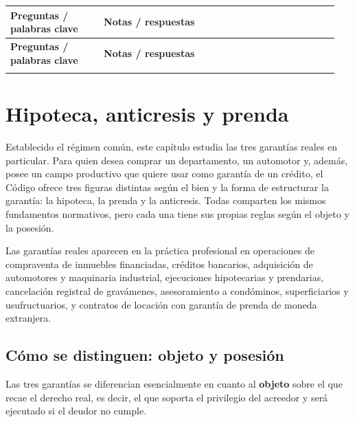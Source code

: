 \documentclass[12pt,oneside]{book}
\makeatletter
\newenvironment{cornell}{%
    \par\vspace{0.5em}
    \noindent
    \begin{longtable}{@{}>{\raggedright\arraybackslash}p{0.27\linewidth}
                         >{\raggedright\arraybackslash}p{0.68\linewidth}@{}}
    \toprule
    \textbf{Preguntas / palabras clave} & \textbf{Notas / respuestas} \\
    \midrule
    \endfirsthead
    \toprule
    \textbf{Preguntas / palabras clave} & \textbf{Notas / respuestas} \\
    \midrule
    \endhead
}{%
    \bottomrule
    \end{longtable}
}
\newcommand{\cornellsummary}[1]{%
    \midrule
    \multicolumn{2}{@{}p{\dimexpr0.95\linewidth+2\tabcolsep\relax}@{}}{%
        \vspace{0.2em}\textbf{Resumen:} #1\vspace{0.2em}} \\
}
\makeatother
\begin{document}
\begin{cornell}
\cornellsummary{El constituyente conserva las facultades inherentes a su derecho pero no puede disminuir el valor de la garantía; los actos en perjuicio de ella son inoponibles al acreedor y el pacto comisorio es nulo, sin afectar la validez del resto de la garantía. El propietario no deudor responde solo con la cosa y puede pagar y subrogarse, defenderse y reclamar el remanente. La garantía alcanza los accesorios y se traslada por subrogación real. La extinción de la garantía debe distinguirse de su cancelación registral.}
\end{cornell}

\chapter{Hipoteca, anticresis y prenda}\label{cap:hip-prenda-antic}

Establecido el régimen común, este capítulo estudia las tres garantías reales en particular. Para quien desea comprar un departamento, un automotor y, además, posee un campo productivo que quiere usar como garantía de un crédito, el Código ofrece tres figuras distintas según el bien y la forma de estructurar la garantía: la hipoteca, la prenda y la anticresis. Todas comparten los mismos fundamentos normativos, pero cada una tiene sus propias reglas según el objeto y la posesión.

Las garantías reales aparecen en la práctica profesional en operaciones de compraventa de inmuebles financiadas, créditos bancarios, adquisición de automotores y maquinaria industrial, ejecuciones hipotecarias y prendarias, cancelación registral de gravámenes, asesoramiento a condóminos, superficiarios y usufructuarios, y contratos de locación con garantía de prenda de moneda extranjera.

\section{Cómo se distinguen: objeto y posesión}

Las tres garantías se diferencian esencialmente en cuanto al \textbf{objeto} sobre el que recae el derecho real, es decir, el que soporta el privilegio del acreedor y será ejecutado si el deudor no cumple.
\end{document}
